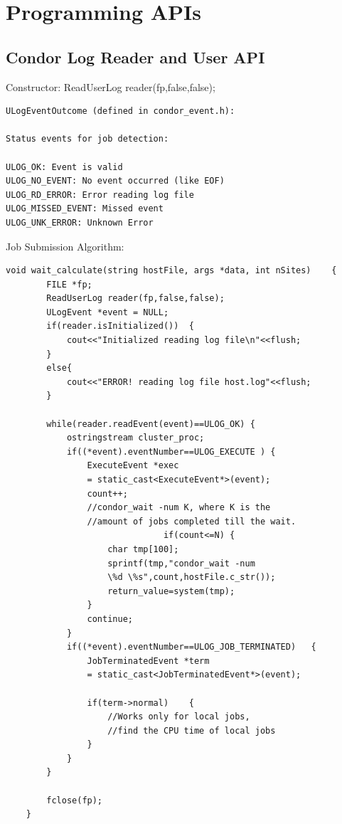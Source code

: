 \documentclass[ms,electronic,double]{nuthesis}
\begin{document}
\section{Programming APIs}
\subsection{Condor Log Reader and User API}
Constructor:
ReadUserLog reader(fp,false,false);
\begin{verbatim}
ULogEventOutcome (defined in condor_event.h):

Status events for job detection:

ULOG_OK: Event is valid
ULOG_NO_EVENT: No event occurred (like EOF)
ULOG_RD_ERROR: Error reading log file
ULOG_MISSED_EVENT: Missed event
ULOG_UNK_ERROR: Unknown Error
\end{verbatim}

Job Submission Algorithm:

\begin{lstlisting}
void wait_calculate(string hostFile, args *data, int nSites)	{		
		FILE *fp;
		ReadUserLog reader(fp,false,false);
		ULogEvent *event = NULL;		
		if(reader.isInitialized())	{
			cout<<"Initialized reading log file\n"<<flush;
		}
		else{
			cout<<"ERROR! reading log file host.log"<<flush;
		}
              
        while(reader.readEvent(event)==ULOG_OK)	{            
            ostringstream cluster_proc;            
            if((*event).eventNumber==ULOG_EXECUTE )	{                                
                ExecuteEvent *exec 
                = static_cast<ExecuteEvent*>(event);                                       
                count++;
                //condor_wait -num K, where K is the 
                //amount of jobs completed till the wait.
                               if(count<=N)	{
                    char tmp[100];
                    sprintf(tmp,"condor_wait -num 
                    \%d \%s",count,hostFile.c_str());
                    return_value=system(tmp);
                }                                
                continue;
            }            
            if((*event).eventNumber==ULOG_JOB_TERMINATED)	{                
                JobTerminatedEvent *term 
                = static_cast<JobTerminatedEvent*>(event);                
                
                if(term->normal)	{                    
                    //Works only for local jobs, 
                    //find the CPU time of local jobs
                }               
            }
        }
        
		fclose(fp);
	}

\end{lstlisting}
\end{document}
